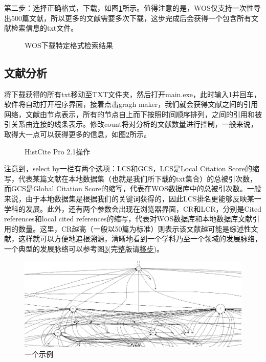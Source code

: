 \documentclass[UTF8,oneside]{ctexbook}
\begin{document}
第二步：选择正确格式，下载，如图\ref{fig:2}所示。值得注意的是，WOS仅支持一次性导出500篇文献，所以更多的文献需要多次下载，这步完成后会获得一个包含所有文献检索信息的txt文件。

\begin{figure}[!htb]
	\centering
	\vspace{-0.3cm}
	\caption{WOS下载特定格式检索结果}\label{fig:2}
\end{figure}

\subsection{文献分析}
将下载获得的所有txt移动至TXT文件夹，然后打开main.exe，此时输入1并回车，软件将自动打开程序界面，接着点击gragh maker，我们就会获得文献之间的引用网络，文献由节点表示，所有的节点自上而下按照时间顺序排列，之间的引用和被引关系由连接的线条表示。修改count将对分析的文献数量进行控制，一般来说，取得大一点可以获得更多的信息，如图\ref{fig:3}所示。

\begin{figure}[!htb]
	\centering
	\vspace{-0.3cm}
	\caption{HistCite Pro 2.1操作}\label{fig:3}
\end{figure}


注意到，select by一栏有两个选项：LCS和GCS，LCS是Local Citation Score的缩写，代表某篇文献在本地数据集（也就是我们所下载的txt集合）的总被引次数，而GCS是Global Citation Score的缩写，代表在WOS数据库中的总被引次数。一般来说，由于本地数据集是根据我们的关键词获得的，因此LCS排名更能够反映某一学科的发展。此外，还有两个参数会出现在浏览器界面，CR和LCR，分别是Cited references和local cited references的缩写，代表对WOS数据库和本地数据库文献引用的数量。这里，CR越高（一般以50篇为标准）则表示该文献越可能是综述性文献，这样就可以方便地追根溯源，清晰地看到一个学科乃至一个领域的发展脉络，一个典型的发展脉络可以参考图\ref{fig:typical_trace}(完整版请\href{https://raw.githubusercontent.com/lonelybag/Latex_lonelybag/V1.0/Script/002_NOTE_of_MASTER/Figure/typical_trace_full.jpg}{移步})。

\begin{figure}[!htb]
	\centering
	\includegraphics[width=1\linewidth]{Figure/typical_trace.JPG}
	\vspace{-0.3cm}
	\caption{一个示例}\label{fig:typical_trace}
\end{figure}
\end{document}
